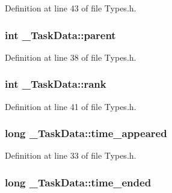 Definition at line 43 of file Types.\+h.

\hypertarget{struct___task_data_a2cfbd4d6957b551f50fc492a70c52c39}{}
\subsubsection[{parent}]{\setlength{\rightskip}{0pt plus 5cm}int \+\_\+\+Task\+Data\+::parent}\label{struct___task_data_a2cfbd4d6957b551f50fc492a70c52c39}


Definition at line 38 of file Types.\+h.

\hypertarget{struct___task_data_acdd53806c2d65870377b46006e51b0f1}{}
\subsubsection[{rank}]{\setlength{\rightskip}{0pt plus 5cm}int \+\_\+\+Task\+Data\+::rank}\label{struct___task_data_acdd53806c2d65870377b46006e51b0f1}


Definition at line 41 of file Types.\+h.

\hypertarget{struct___task_data_af954fddad12e02dc1ba32fa44827acdf}{}
\subsubsection[{time\+\_\+appeared}]{\setlength{\rightskip}{0pt plus 5cm}long \+\_\+\+Task\+Data\+::time\+\_\+appeared}\label{struct___task_data_af954fddad12e02dc1ba32fa44827acdf}


Definition at line 33 of file Types.\+h.

\hypertarget{struct___task_data_a0bc3b4e0101f278c855489ac8b3b506d}{}
\subsubsection[{time\+\_\+ended}]{\setlength{\rightskip}{0pt plus 5cm}long \+\_\+\+Task\+Data\+::time\+\_\+ended}\label{struct___task_data_a0bc3b4e0101f278c855489ac8b3b506d}



